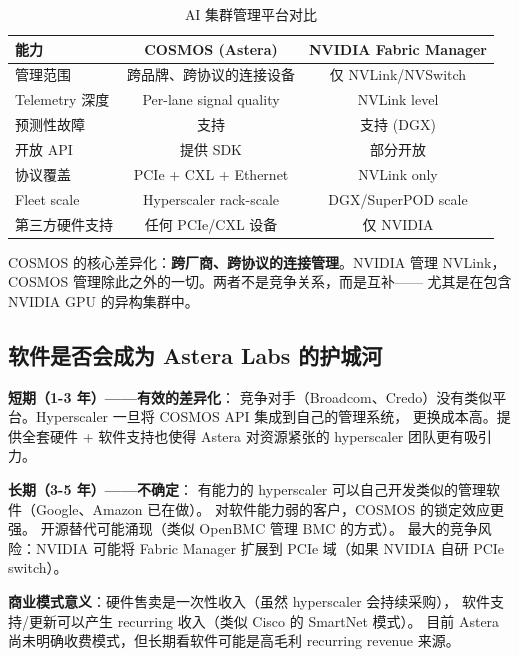 \begin{table}[htb]
    \centering
    \caption{AI 集群管理平台对比}
    \label{tab:cosmos-vs-nvidia}
    \begin{tabular}{lcc}
        \toprule
        \textbf{能力} & \textbf{COSMOS (Astera)} & \textbf{NVIDIA Fabric Manager} \\
        \midrule
        管理范围 & 跨品牌、跨协议的连接设备 & 仅 NVLink/NVSwitch \\
        Telemetry 深度 & Per-lane signal quality & NVLink level \\
        预测性故障 & 支持 & 支持 (DGX) \\
        开放 API & 提供 SDK & 部分开放 \\
        协议覆盖 & PCIe + CXL + Ethernet & NVLink only \\
        Fleet scale & Hyperscaler rack-scale & DGX/SuperPOD scale \\
        第三方硬件支持 & 任何 PCIe/CXL 设备 & 仅 NVIDIA \\
        \bottomrule
    \end{tabular}
\end{table}

COSMOS 的核心差异化：\textbf{跨厂商、跨协议的连接管理}。NVIDIA 管理 NVLink，
COSMOS 管理除此之外的一切。两者不是竞争关系，而是互补——
尤其是在包含 NVIDIA GPU 的异构集群中。

\subsection{软件是否会成为 Astera Labs 的护城河}

\textbf{短期（1-3 年）——有效的差异化}：
竞争对手（Broadcom、Credo）没有类似平台。Hyperscaler 一旦将 COSMOS API 集成到自己的管理系统，
更换成本高。提供全套硬件 + 软件支持也使得 Astera 对资源紧张的 hyperscaler 团队更有吸引力。

\textbf{长期（3-5 年）——不确定}：
有能力的 hyperscaler 可以自己开发类似的管理软件（Google、Amazon 已在做）。
对软件能力弱的客户，COSMOS 的锁定效应更强。
开源替代可能涌现（类似 OpenBMC 管理 BMC 的方式）。
最大的竞争风险：NVIDIA 可能将 Fabric Manager 扩展到 PCIe 域（如果 NVIDIA 自研 PCIe switch）。

\textbf{商业模式意义}：硬件售卖是一次性收入（虽然 hyperscaler 会持续采购），
软件支持/更新可以产生 recurring 收入（类似 Cisco 的 SmartNet 模式）。
目前 Astera 尚未明确收费模式，但长期看软件可能是高毛利 recurring revenue 来源。
